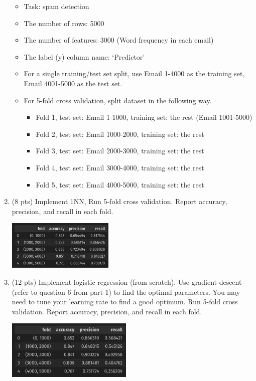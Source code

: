 \documentclass[a4paper]{article}
\theoremstyle{definition}
\newenvironment{soln}{
    \leavevmode\color{blue}\ignorespaces
}{}
\begin{document}
\begin{enumerate}
	\begin{itemize}
		\item Task: spam detection
		\item The number of rows: 5000
		\item The number of features: 3000 (Word frequency in each email)
		\item The label (y) column name: `Predictor'
		\item For a single training/test set split, use Email 1-4000 as the training set, Email 4001-5000 as the test set.
		\item For 5-fold cross validation, split dataset in the following way.
		\begin{itemize}
			\item Fold 1, test set: Email 1-1000, training set: the rest (Email 1001-5000)
			\item Fold 2, test set: Email 1000-2000, training set: the rest
			\item Fold 3, test set: Email 2000-3000, training set: the rest
			\item Fold 4, test set: Email 3000-4000, training set: the rest
			\item Fold 5, test set: Email 4000-5000, training set: the rest			
		\end{itemize}
	\end{itemize}
	
	\item (8 pts) Implement 1NN, Run 5-fold cross validation. Report accuracy, precision, and recall in each fold.
	
	\begin{soln}
            \includegraphics[width=0.4\textwidth]{hw3/2_2.png}\\
        \end{soln}
	
	\item (12 pts) Implement logistic regression (from scratch). Use gradient descent (refer to question 6 from part 1) to find the optimal parameters. You may need to tune your learning rate to find a good optimum. Run 5-fold cross validation. Report accuracy, precision, and recall in each fold.
	
	\begin{soln}  
            \includegraphics[width=6cm]{2_3.png}
        \end{soln}
	

\end{enumerate}
\end{document}
